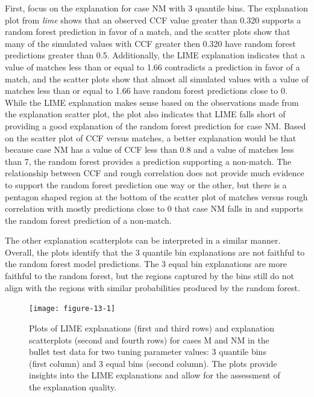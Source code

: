 \documentclass[AMS,STIX2COL]{WileyNJD-v2}\usepackage[]{graphicx}\usepackage[]{color}
\newenvironment{knitrout}{}{} %
\begin{document}
First, focus on the explanation for case NM with 3 quantile bins. The explanation plot from \emph{lime} shows that an observed CCF value greater than 0.320 supports a random forest prediction in favor of a match, and the scatter plots show that many of the simulated values with CCF greater then 0.320 have random forest predictions greater than 0.5. Additionally, the LIME explanation indicates that a value of matches less than or equal to 1.66 contradicts a prediction in favor of a match, and the scatter plots show that almost all simulated values with a value of matches less than or equal to 1.66 have random forest predictions close to 0. While the LIME explanation makes sense based on the observations made from the explanation scatter plot, the plot also indicates that LIME falls short of providing a good explanation of the random forest prediction for case NM. Based on the scatter plot of CCF versus matches, a better explanation would be that because case NM has a value of CCF less than 0.8 and a value of matches less than 7, the random forest provides a prediction supporting a non-match. The relationship between CCF and rough correlation does not provide much evidence to support the random forest prediction one way or the other, but there is a pentagon shaped region at the bottom of the scatter plot of matches versus rough correlation with mostly predictions close to 0 that case NM falls in and supports the random forest prediction of a non-match.

The other explanation scatterplots can be interpreted in a similar manner. Overall, the plots identify that the 3 quantile bin explanations are not faithful to the random forest model predictions. The 3 equal bin explanations are more faithful to the random forest, but the regions captured by the bins still do not align with the regions with similar probabilities produced by the random forest.

\begin{figure}[!thp]
\begin{knitrout}
\color{fgcolor}

{\centering \texttt{[image: figure-13-1]} 

}



\end{knitrout}
\caption{Plots of LIME explanations (first and third rows) and explanation scatterplots (second and fourth rows) for  cases M and NM in the bullet test data for two tuning parameter values: 3 quantile bins (first column) and 3 equal bins (second column).  The plots provide insights into the LIME explanations and allow for the assessment of the explanation quality.}
\label{fig:figure-13}
\end{figure}
\end{document}
